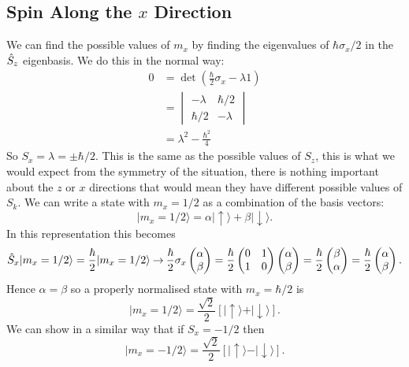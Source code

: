 \documentclass[a4paper]{article}
\renewcommand{\ket}[1]{\vert {#1} \rangle}
\renewcommand{\ident}{1}
\newcommand{\spinUp}{\uparrow}
\newcommand{\spinDown}{\downarrow}
\newcommand{\representation}{\mathbin{\rightarrow}}
\theoremstyle{definition}
\begin{document}
    \subsection{Spin Along the \texorpdfstring{\(x\)}{x} Direction}
    We can find the possible values of \(m_x\) by finding the eigenvalues of \(\hbar\sigma_x/2\) in the \(\hat{S}_z\) eigenbasis.
    We do this in the normal way:
    \begin{align*}
        0 &= \det\left(\frac{\hbar}{2}\sigma_x - \lambda\ident\right)\\
        &= 
        \begin{vmatrix}
            -\lambda & \hbar/2\\
            \hbar/2 & -\lambda
        \end{vmatrix}
        \\
        &= \lambda^2 - \frac{\hbar^2}{4}
    \end{align*}
    So \(S_x = \lambda = \pm \hbar/2\).
    This is the same as the possible values of \(S_z\), this is what we would expect from the symmetry of the situation, there is nothing important about the \(z\) or \(x\) directions that would mean they have different possible values of \(S_k\).
    We can write a state with \(m_x = 1/2\) as a combination of the basis vectors:
    \[\ket{m_x = 1/2} = \alpha\ket{\spinUp} + \beta\ket{\spinDown}.\]
    In this representation this becomes
    \[
        \operator{S}_x\ket{m_x = 1/2} = \frac{\hbar}{2}\ket{m_x = 1/2} \representation \frac{\hbar}{2}\sigma_x
        \begin{pmatrix}
            \alpha\\ \beta
        \end{pmatrix}
        =
        \frac{\hbar}{2}
        \begin{pmatrix}
            0 & 1\\
            1 & 0
        \end{pmatrix}
        \begin{pmatrix}
            \alpha\\ \beta
        \end{pmatrix}
        = \frac{\hbar}{2}
        \begin{pmatrix}
            \beta\\ \alpha
        \end{pmatrix}
        = \frac{\hbar}{2}
        \begin{pmatrix}
            \alpha\\ \beta
        \end{pmatrix}
        .
    \]
    Hence \(\alpha = \beta\) so a properly normalised state with \(m_x = \hbar/2\) is
    \[\ket{m_x = 1/2} = \frac{\sqrt{2}}{2}\left[\ket{\spinUp} + \ket{\spinDown}\right].\]
    We can show in a similar way that if \(S_x = -1/2\) then
    \[\ket{m_x = -1/2} = \frac{\sqrt{2}}{2}\left[\ket{\spinUp} - \ket{\spinDown}\right].\]
    
\end{document}
